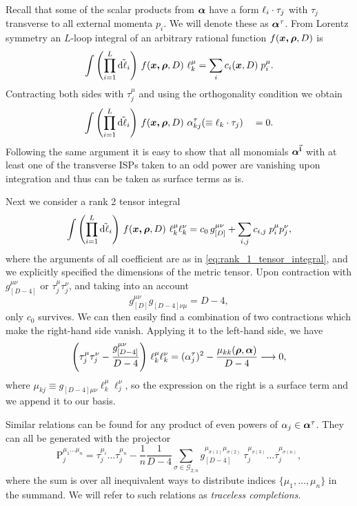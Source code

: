 Recall that some of the scalar products from $\vb*{\alpha}$ have a form $\sp(\ell_i,\tau_j)$ with $\tau_j$ transverse to all external momenta $p_i$.
We will denote these as $\vb*{\alpha}^\tau$.
From Lorentz symmetry an $L$-loop integral of an arbitrary rational function $f(\vb*{\vb*{x},\vb*{\rho}},D)$ is
\begin{equation} \label{eq:rank_1_tensor_integral}
  \int \qty(\prod_{i=1}^{L} \tilde{\dd{\ell_i}}){}~ f(\vb*{\vb*{x},\vb*{\rho}},D) ~ \ell_k^{\mu} = \sum_{i}^{}c_i(\vb*{x},D)\;p^\mu_i.
\end{equation}
Contracting both sides with $\tau^\mu_j$ and using the orthogonality condition we obtain
\begin{equation}
  \Dmeasure{}~ f(\vb*{\vb*{x},\vb*{\rho}},D) ~ \alpha^{\tau}_{k j}( \equiv \sp(\ell_k,\tau_j)) \quad = 0.
\end{equation}
Following the same argument it is easy to show that all monomials $\vb*{\alpha}^{\va{i}}$ with at least
one of the transverse ISPs taken to an odd power are vanishing upon integration and thus can be taken as surface terms as is.

Next we consider a rank 2 tensor integral
\begin{equation}
  \int \qty(\prod_{i=1}^{L} \tilde{\dd{\ell_i}}){}~ f(\vb*{\vb*{x},\vb*{\rho}},D) ~ \ell_k^{\mu}\ell_k^{\nu} = c_0\,g^{\mu\nu}_{[D]} + \sum_{i,j}^{}c_{i,j}\;p^\mu_i p^\nu_j,
\end{equation}
where the arguments of all coefficient are as in \cref{eq:rank_1_tensor_integral}, and we explicitly specified the dimensions of the metric tensor.
Upon contraction with $g^{\mu\nu}_{[D-4]}$ or $\tau_j^\mu\tau_j^\nu$, and taking into an account
\[
  g^{\mu\nu}_{[D]}g^{\phantom{\mu\nu}}_{[D-4]\nu\mu} = D-4,
\]
only $c_0$ survives.
We can then easily find a combination of two contractions which make the right-hand side vanish. Applying it to the left-hand side, we have
\begin{equation}
  \qty(\tau_j^\mu\tau_j^\nu - \frac{g^{\mu\nu}_{[D-4]}}{D-4}) ~ \ell_k^{\mu}\ell_k^{\nu} = (\alpha_j^\tau)^2 - \frac{\mu_{kk}(\vb*{\rho},\vb*{\alpha})}{D-4} \longrightarrow 0,
\end{equation}
where $\mu_{kj} \equiv g^{\phantom{\mu\nu}}_{[D-4]\mu\nu} \ell_k^\mu \ell_j^\nu$, so the expression on the right is a surface term and
we append it to our basis.


Similar relations can be found for any product of even powers of $\alpha_j \in \vb*{\alpha}^\tau$.
They can all be generated with the projector
\begin{equation}
  \mathrm{P}^{\mu_1\ldots{}\mu_n}_j =  \tau^{\mu_i}_j\ldots{}\tau^{\mu_n}_j - \frac{1}{n}\frac{1}{D-4} \sum_{\sigma \in \mathcal{G}_{2;n}}^{} g^{\mu_{\sigma(1)}\mu_{\sigma(2)}}_{[D-4]}~\tau^{\mu_{\sigma(3)}}_j\ldots{}\tau^{\mu_{\sigma(n)}}_j,
\end{equation}
where the sum is over all inequivalent ways to distribute indices $\{\mu_1,\ldots{},\mu_n\}$ in the summand.
We will refer to such relations as \emph{traceless completions}.

